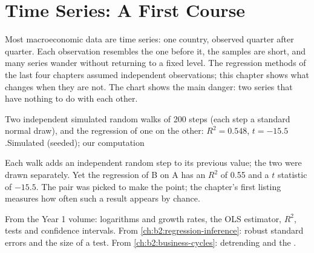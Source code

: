 \chapter{Time Series: A First Course}\label{ch:b2:time-series}

Most macroeconomic data are time series: one country, observed quarter after quarter. Each observation resembles the one
before it, the samples are short, and many series wander without returning to a fixed level. The regression methods of
the last four chapters assumed independent observations; this chapter shows what changes when they are not. The chart
shows the main danger: two series that have nothing to do with each other.

\begin{openingchart}{Two independent simulated random walks of 200 steps (each step a standard normal draw), and the
  regression of one on the other: $R^2 = 0.548$, $t = -15.5$.}{Simulated (seeded); our computation}
\end{openingchart}

Each walk adds an independent random step to its previous value; the two were drawn separately. Yet the regression of B on
A has an $R^2$ of 0.55 and a $t$ statistic of $-15.5$. The pair was picked to make the point; the chapter's first listing
measures how often such a result appears by chance.

\begin{recall}
From the Year 1 volume: logarithms and growth rates, the OLS estimator, $R^2$, tests and confidence intervals. From
\cref{ch:b2:regression-inference}: robust standard errors and the size of a test. From \cref{ch:b2:business-cycles}:
detrending and the .
\end{recall}

